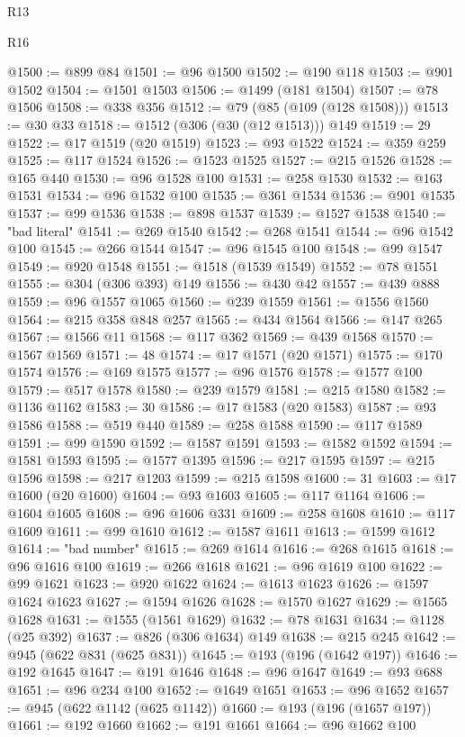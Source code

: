 \begin{lexlean}{R13}
\begin{lexlean}{R16}
\begin{coremodule}
{{{{{{{{{{{{{{{{{{{{{{{{{{{{{{{{{{{{{{{{{{{{{{{{{{{{{{{{{{{{{{{{{{{{{{{{{{{{{{{{{{{{{{{{{{{{{{{{{{{{{{{{{{{{{{{{{@1500 := @899 @84
@1501 := @96 @1500
@1502 := @190 @118
@1503 := @901 @1502
@1504 := @1501 @1503
@1506 := @1499 (@181 @1504)
@1507 := @78 @1506
@1508 := @338 @356
@1512 := @79 (@85 (@109 (@128 @1508)))
@1513 := @30 @33
@1518 := @1512 (@306 (@30 (@12 @1513))) @149
@1519 := 29
@1522 := @17 @1519 (@20 @1519)
@1523 := @93 @1522
@1524 := @359 @259
@1525 := @117 @1524
@1526 := @1523 @1525
@1527 := @215 @1526
@1528 := @165 @440
@1530 := @96 @1528 @100
@1531 := @258 @1530
@1532 := @163 @1531
@1534 := @96 @1532 @100
@1535 := @361 @1534
@1536 := @901 @1535
@1537 := @99 @1536
@1538 := @898 @1537
@1539 := @1527 @1538
@1540 := "bad literal"
@1541 := @269 @1540
@1542 := @268 @1541
@1544 := @96 @1542 @100
@1545 := @266 @1544
@1547 := @96 @1545 @100
@1548 := @99 @1547
@1549 := @920 @1548
@1551 := @1518 (@1539 @1549)
@1552 := @78 @1551
@1555 := @304 (@306 @393) @149
@1556 := @430 @42
@1557 := @439 @888
@1559 := @96 @1557 @1065
@1560 := @239 @1559
@1561 := @1556 @1560
@1564 := @215 @358 @848 @257
@1565 := @434 @1564
@1566 := @147 @265
@1567 := @1566 @11
@1568 := @117 @362
@1569 := @439 @1568
@1570 := @1567 @1569
@1571 := 48
@1574 := @17 @1571 (@20 @1571)
@1575 := @170 @1574
@1576 := @169 @1575
@1577 := @96 @1576
@1578 := @1577 @100
@1579 := @517 @1578
@1580 := @239 @1579
@1581 := @215 @1580
@1582 := @1136 @1162
@1583 := 30
@1586 := @17 @1583 (@20 @1583)
@1587 := @93 @1586
@1588 := @519 @440
@1589 := @258 @1588
@1590 := @117 @1589
@1591 := @99 @1590
@1592 := @1587 @1591
@1593 := @1582 @1592
@1594 := @1581 @1593
@1595 := @1577 @1395
@1596 := @217 @1595
@1597 := @215 @1596
@1598 := @217 @1203
@1599 := @215 @1598
@1600 := 31
@1603 := @17 @1600 (@20 @1600)
@1604 := @93 @1603
@1605 := @117 @1164
@1606 := @1604 @1605
@1608 := @96 @1606 @331
@1609 := @258 @1608
@1610 := @117 @1609
@1611 := @99 @1610
@1612 := @1587 @1611
@1613 := @1599 @1612
@1614 := "bad number"
@1615 := @269 @1614
@1616 := @268 @1615
@1618 := @96 @1616 @100
@1619 := @266 @1618
@1621 := @96 @1619 @100
@1622 := @99 @1621
@1623 := @920 @1622
@1624 := @1613 @1623
@1626 := @1597 @1624 @1623
@1627 := @1594 @1626
@1628 := @1570 @1627
@1629 := @1565 @1628
@1631 := @1555 (@1561 @1629)
@1632 := @78 @1631
@1634 := @1128 (@25 @392)
@1637 := @826 (@306 @1634) @149
@1638 := @215 @245
@1642 := @945 (@622 @831 (@625 @831))
@1645 := @193 (@196 (@1642 @197))
@1646 := @192 @1645
@1647 := @191 @1646
@1648 := @96 @1647
@1649 := @93 @688
@1651 := @96 @234 @100
@1652 := @1649 @1651
@1653 := @96 @1652
@1657 := @945 (@622 @1142 (@625 @1142))
@1660 := @193 (@196 (@1657 @197))
@1661 := @192 @1660
@1662 := @191 @1661
@1664 := @96 @1662 @100
}}}}}}}}}}}}}}}}}}}}}}}}}}}}}}}}}}}}}}}}}}}}}}}}}}}}}}}}}}}}}}}}}}}}}}}}}}}}}}}}}}}}}}}}}}}}}}}}}}}}}}}}}}}}}}}}}
\end{coremodule}
\end{lexlean}
\end{lexlean}
